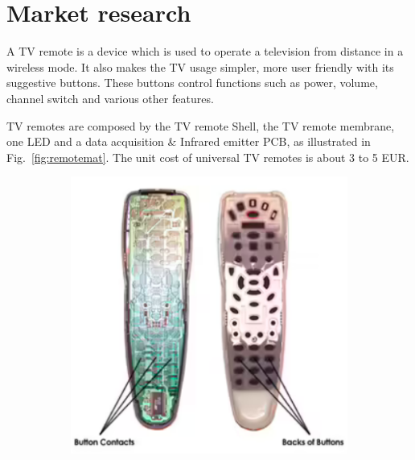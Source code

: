\section{Market research}
\label{sec:market-research}
A TV remote is a device which is used to operate a television from
distance in a wireless mode. It also makes the TV usage simpler, more user friendly with its suggestive buttons. These buttons control functions such as power, volume, channel switch and various other features.

TV remotes are composed by the TV remote Shell,
the TV remote membrane, one LED and a data acquisition \& Infrared emitter PCB,
as illustrated in Fig.~\ref{fig:remotemat}. The unit cost of universal TV remotes is about 3 to 5 EUR.
%
\begin{figure}[htb!]
  \centering
  \begin{subfigure}{.4\textwidth}
  \includegraphics[width=\textwidth]{img/remotematerial1.png}%
\end{subfigure}
%
  \begin{subfigure}{.4\textwidth}

\end{subfigure}
\end{figure}

